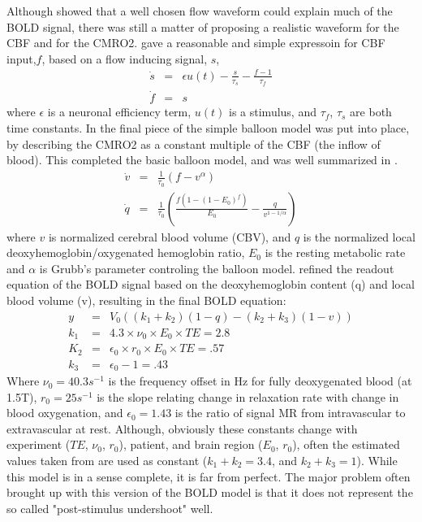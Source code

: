 \documentclass{article}
\begin{document}
Although \cite{Buxton1998} showed that a well chosen flow waveform could 
explain much of the BOLD signal, there was still a matter of proposing a
realistic waveform for the CBF and for the CMRO2. \cite{friston2000} gave
a reasonable and simple
expressoin for CBF input,$f$, based on a flow inducing signal, $s$, 
\begin{eqnarray}
\dot{s} &=& \epsilon u(t) - \frac{s}{\tau_s} - \frac{f - 1}{\tau_f} \\
\dot{f} &=& s
\end{eqnarray}
where $\epsilon$ is a neuronal efficiency term, $u(t)$ is a stimulus, and $\tau_f$, $\tau_s$
are both time constants. In \cite{Buxton2004} the final piece of the simple balloon
model was put into place, by describing the CMRO2 as a constant multiple of
the CBF (the inflow of blood). This completed the basic balloon model, and 
was well summarized in \cite{Riera2004}. 
\begin{eqnarray}
\dot{v} &=& \frac{1}{\tau_0}(f - v^\alpha)\\
\dot{q} &=& \frac{1}{\tau_0}(\frac{f(1-(1-E_0)^f)}{E_0} - \frac{q}{v^{1-1/\alpha}})
\end{eqnarray}
where $v$ is normalized cerebral blood volume (CBV), and $q$ is the normalized
local deoxyhemoglobin/oxygenated hemoglobin ratio, $E_0$ is the resting metabolic
rate and $\alpha$ is Grubb's parameter controling the balloon model. 
\cite{Obata2004} refined the readout equation of the BOLD signal based on the
deoxyhemoglobin content (q) and local blood volume (v), resulting in the
final BOLD equation:
\begin{eqnarray}
y   &=& V_0((k_1 + k_2)(1-q) - (k_2 + k_3)(1-v))\\
k_1 &=& 4.3 \times \nu_0 \times E_0 \times TE = 2.8\\
K_2 &=& \epsilon_0 \times r_0 \times E_0 \times TE = .57\\
k_3 &=& \epsilon_0 - 1 = .43
\end{eqnarray}
Where $\nu_0 = 40.3 s^{-1}$  is the frequency offset in Hz for fully
deoxygenated blood (at 1.5T), $r_0 = 25 s^{-1}$  is the slope relating
change in relaxation rate with change in blood oxygenation, and
$\epsilon_0 = 1.43$ is the 
ratio of signal MR from intravascular to extravascular at rest. Although,
obviously these constants change with experiment ($TE$, $\nu_0$, $r_0$),
patient, and brain 
region ($E_0$, $r_0$), often the estimated values taken from \cite{Obata2004} are used
as constant ($k_1 + k_2 = 3.4$, and $k_2+k_3 = 1$).
While this model is in a sense complete, it is far from perfect. The major
problem often brought up with this version of the BOLD model is that it
does not represent the so called "post-stimulus undershoot" well.
\end{document}
